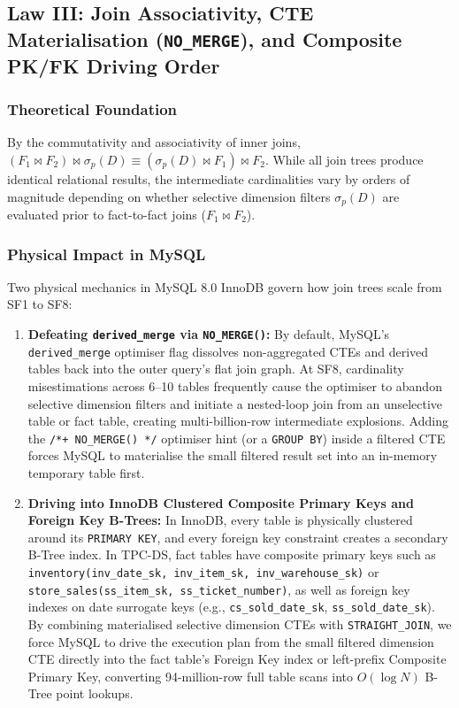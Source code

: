 \documentclass{ULBreport}
\begin{document}
\subsection{Law III: Join Associativity, CTE Materialisation (\texttt{NO\_MERGE}), and Composite PK/FK Driving Order}

\subsubsection{Theoretical Foundation}
By the commutativity and associativity of inner joins, $(F_1 \bowtie F_2) \bowtie \sigma_p(D) \equiv (\sigma_p(D) \bowtie F_1) \bowtie F_2$. While all join trees produce identical relational results, the intermediate cardinalities vary by orders of magnitude depending on whether selective dimension filters $\sigma_p(D)$ are evaluated prior to fact-to-fact joins ($F_1 \bowtie F_2$).

\subsubsection{Physical Impact in MySQL}
Two physical mechanics in MySQL 8.0 InnoDB govern how join trees scale from SF1 to SF8:
\begin{enumerate}
    \item \textbf{Defeating \texttt{derived\_merge} via \texttt{NO\_MERGE()}:} By default, MySQL's \texttt{derived\_merge} optimiser flag dissolves non-aggregated CTEs and derived tables back into the outer query's flat join graph. At SF8, cardinality misestimations across 6--10 tables frequently cause the optimiser to abandon selective dimension filters and initiate a nested-loop join from an unselective table or fact table, creating multi-billion-row intermediate explosions. Adding the \texttt{/*+ NO\_MERGE() */} optimiser hint (or a \texttt{GROUP BY}) inside a filtered CTE forces MySQL to materialise the small filtered result set into an in-memory temporary table first.
    \item \textbf{Driving into InnoDB Clustered Composite Primary Keys and Foreign Key B-Trees:} In InnoDB, every table is physically clustered around its \texttt{PRIMARY KEY}, and every foreign key constraint creates a secondary B-Tree index. In TPC-DS, fact tables have composite primary keys such as \texttt{inventory(inv\_date\_sk, inv\_item\_sk, inv\_warehouse\_sk)} or \texttt{store\_sales(ss\_item\_sk, ss\_ticket\_number)}, as well as foreign key indexes on date surrogate keys (e.g., \texttt{cs\_sold\_date\_sk}, \texttt{ss\_sold\_date\_sk}). By combining materialised selective dimension CTEs with \texttt{STRAIGHT\_JOIN}, we force MySQL to drive the execution plan from the small filtered dimension CTE directly into the fact table's Foreign Key index or left-prefix Composite Primary Key, converting 94-million-row full table scans into $O(\log N)$ B-Tree point lookups.
\end{enumerate}
\end{document}

